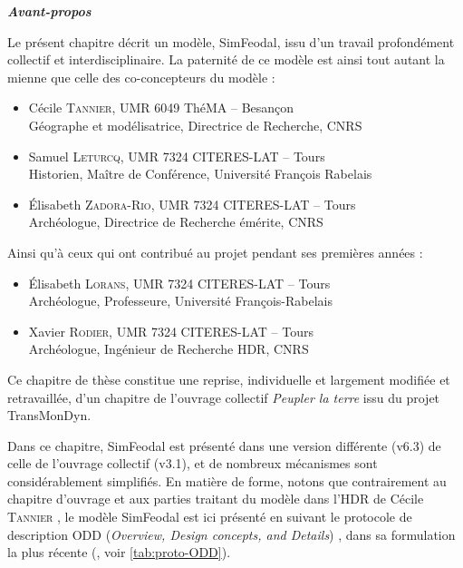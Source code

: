 \begin{mdframed}[backgroundcolor=black!5,footnoteinside=false]
\textbf{\hypertarget{avant-propos}{\textit{Avant-propos}}}

Le présent chapitre décrit un modèle, SimFeodal, issu d'un travail profondément collectif et interdisciplinaire.
La paternité de ce modèle est ainsi tout autant la mienne que celle des co-concepteurs du modèle :
\begin{itemize}
	\item Cécile \textsc{Tannier}, UMR 6049 ThéMA -- Besançon\\
	Géographe et modélisatrice, Directrice de Recherche, CNRS
	\item Samuel \textsc{Leturcq}, UMR 7324 CITERES-LAT -- Tours\\
	Historien, Maître de Conférence, Université François Rabelais
	\item Élisabeth \textsc{Zadora-Rio}, UMR 7324 CITERES-LAT -- Tours\\
	Archéologue, Directrice de Recherche émérite, CNRS
\end{itemize}
Ainsi qu'à ceux qui ont contribué au projet pendant ses premières années :
\begin{itemize}
	\item Élisabeth \textsc{Lorans}, UMR 7324 CITERES-LAT -- Tours\\
	Archéologue, Professeure, Université François-Rabelais
	\item Xavier \textsc{Rodier}, UMR 7324 CITERES-LAT -- Tours\\
	Archéologue, Ingénieur de Recherche HDR, CNRS
\end{itemize}
Ce chapitre de thèse constitue une reprise, individuelle et largement modifiée et retravaillée, d'un chapitre \autocite{cura_transition_2017} de l'ouvrage collectif \textit{Peupler la terre} \autocite{sanders2018peupler} issu du projet TransMonDyn\footnotemark.

Dans ce chapitre, SimFeodal est présenté dans une version différente (v6.3) de celle de l'ouvrage collectif (v3.1), et de nombreux mécanismes sont considérablement simplifiés.
En matière de forme, notons que contrairement au chapitre d'ouvrage et aux parties traitant du modèle dans l'HDR de Cécile \textsc{Tannier} \autocite{tannier_analyse_2017}, le modèle SimFeodal est ici présenté en suivant le protocole de description \og ODD\fg{} (\textit{Overview, Design concepts, and Details}) \autocite{grimm_odd_2010}, dans sa formulation la plus récente (\cite{grimm_documenting_2017}, voir \cref{tab:proto-ODD}).


\end{mdframed}
